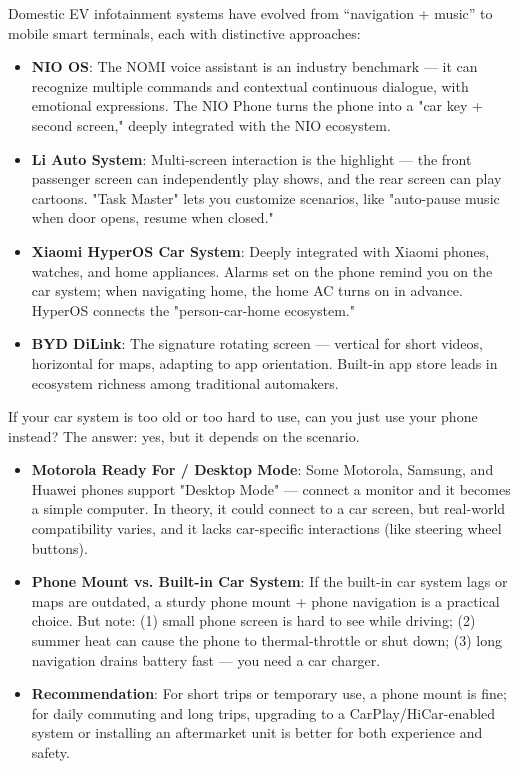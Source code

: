 
Domestic EV infotainment systems have evolved from “navigation + music” to mobile smart terminals, each with distinctive approaches:

\begin{itemize}
  \item \textbf{NIO OS}: The NOMI voice assistant is an industry benchmark — it can recognize multiple commands and contextual continuous dialogue, with emotional expressions. The NIO Phone turns the phone into a "car key + second screen," deeply integrated with the NIO ecosystem.
  \item \textbf{Li Auto System}: Multi-screen interaction is the highlight — the front passenger screen can independently play shows, and the rear screen can play cartoons. "Task Master" lets you customize scenarios, like "auto-pause music when door opens, resume when closed."
  \item \textbf{Xiaomi HyperOS Car System}: Deeply integrated with Xiaomi phones, watches, and home appliances. Alarms set on the phone remind you on the car system; when navigating home, the home AC turns on in advance. HyperOS connects the "person-car-home ecosystem."
  \item \textbf{BYD DiLink}: The signature rotating screen — vertical for short videos, horizontal for maps, adapting to app orientation. Built-in app store leads in ecosystem richness among traditional automakers.
\end{itemize}


If your car system is too old or too hard to use, can you just use your phone instead? The answer: yes, but it depends on the scenario.

\begin{itemize}
  \item \textbf{Motorola Ready For / Desktop Mode}: Some Motorola, Samsung, and Huawei phones support "Desktop Mode" — connect a monitor and it becomes a simple computer. In theory, it could connect to a car screen, but real-world compatibility varies, and it lacks car-specific interactions (like steering wheel buttons).
  \item \textbf{Phone Mount vs. Built-in Car System}: If the built-in car system lags or maps are outdated, a sturdy phone mount + phone navigation is a practical choice. But note: (1) small phone screen is hard to see while driving; (2) summer heat can cause the phone to thermal-throttle or shut down; (3) long navigation drains battery fast — you need a car charger.
  \item \textbf{Recommendation}: For short trips or temporary use, a phone mount is fine; for daily commuting and long trips, upgrading to a CarPlay/HiCar-enabled system or installing an aftermarket unit is better for both experience and safety.
\end{itemize}

